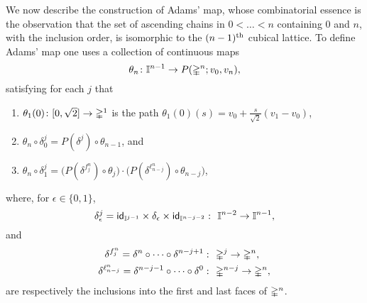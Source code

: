 We now describe the construction of Adams' map, whose combinatorial essence is the observation that the set of ascending chains in $0 < \dots < n$ containing $0$ and $n$, with the inclusion order, is isomorphic to the $(n-1)^{\mathrm{th}}$ cubical lattice.
To define Adams' map one uses a collection of continuous maps
\[
\theta_n \colon \mathbb{I}^{n-1} \to P(\mathbb{\Delta}^n;v_0,v_n),
\]
satisfying for each $j$ that
\begin{enumerate} \label{adamsequations}
	\item $\theta_1(0)\colon [0,\sqrt{2}] \to \mathbb{\Delta}^1$ is the path $\theta_1(0)(s) = v_0+ \frac{s}{\sqrt{2}}(v_1-v_0)$,
	\item $\theta_n \circ \delta_0^j = P(\delta^j) \circ \theta_{n-1}$, and
	\item $\theta_n \circ \delta_1^j =
	\big(P(\delta^{f^n_j}) \circ \theta_j\big) \cdot \big(P(\delta^{\ell^n_{n-j}}) \circ \theta_{n-j}\big)$,
\end{enumerate}
where, for $\epsilon \in \{0,1\}$,
\[
\delta_\epsilon^j = \id_{\gcube^{j-1}} \times \delta_\epsilon \times \id_{\gcube^{n-j-2}} \,\colon\ \gcube^{n-2} \to \gcube^{n-1},
\]
and
\[
\begin{split}
	\delta^{f^n_j} = \delta^n \circ \dotsb \circ \delta^{n-j+1} &\,\colon\ \mathbb{\Delta}^j \to \mathbb{\Delta}^n, \\
	\delta^{\ell^n_{n-j}} = \delta^{n-j-1} \circ \dotsb \circ \delta^{0} &\, \colon\ \mathbb{\Delta}^{n-j} \to \mathbb{\Delta}^n,
\end{split}
\]
are respectively the inclusions into the first and last faces of $\mathbb{\Delta}^n$.

